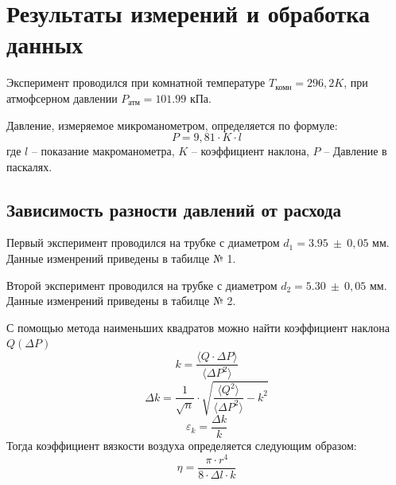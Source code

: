 \documentclass[a4paper, 10pt, twocolumn]{article}
\begin{document}
\section{Результаты измерений и обработка данных}
    Эксперимент проводился при комнатной температуре $T_\text{комн}=296,2 K$, при атмофсерном давлении $P_\text{атм}=101.99$ кПа.

    Давление, измеряемое микроманометром, определяется по формуле:
    \[
    P=9,81 \cdot K \cdot l 
    \]
    где $l$ -- показание макроманометра, $K$ -- коэффициент наклона, $P$ -- Давление в паскалях.
\subsection{Зависимость разности давлений от расхода}
    Первый эксперимент проводился на трубке с диаметром $d_1 = 3.95\ \pm\ 0,05$ мм. Данные изменрений приведены в табилце № 1.

    Второй эксперимент проводился на трубке с диаметром $d_2 = 5.30\ \pm\ 0,05$ мм. Данные изменрений приведены в табилце № 2.


    С помощью метода наименьших квадратов можно найти коэффициент наклона $Q(\Delta P)$
    $$ k = \frac{\langle Q \cdot \Delta P\rangle}{\langle{\Delta P}^2\rangle} $$
    $$ \Delta k = \frac{1}{\sqrt{n}}\cdot\sqrt{\frac{\langle Q^2 \rangle}{\langle \Delta P^2 \rangle} - k^2}$$
    $$\varepsilon_k = \frac{\Delta k}{k}$$
    Тогда коэффициент вязкости воздуха определяется следующим образом:
    $$ \eta = \frac{\pi \cdot r^4}{8 \cdot \Delta l \cdot k}$$
\end{document}
